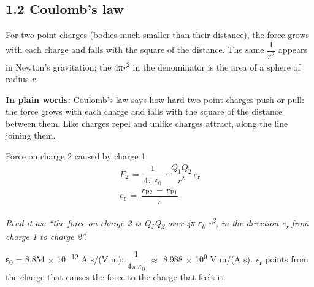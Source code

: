 \documentclass[11pt]{article}
\begin{document}
\begin{keepsection}
\section{1.2 Coulomb’s law}

For two point charges (bodies much smaller than their distance), the force grows with each charge and falls with the square of the distance. The same {\small\ensuremath{\dfrac{1}{{r}^{2}}}} appears in Newton’s gravitation; the 4π\textit{r}\textsuperscript{2} in the denominator is the area of a sphere of radius \textit{r}.

\begin{plainbox}\textbf{In plain words:} Coulomb’s law says how hard two point charges push or pull: the force grows with each charge and falls with the square of the distance between them. Like charges repel and unlike charges attract, along the line joining them.\end{plainbox}

\begin{equationcard}{Force on charge 2 caused by charge 1}
\[ \begin{gathered} {F}_{2}\, =\, \dfrac{1}{4π\, ε_{0}}\, \cdot \, \dfrac{{Q}_{1}{Q}_{2}}{{r}^{2}}\, {e}_{\mathrm{r}} \\ {e}_{\mathrm{r}}\, =\, \dfrac{{r}_{\mathrm{P}2}\, -\, {r}_{\mathrm{P}1}}{{r}} \end{gathered} \]
{\small \emph{Read it as: “the force on charge 2 is Q\textsubscript{1}Q\textsubscript{2} over 4π ε\textsubscript{0} r\textsuperscript{2}, in the direction e\textsubscript{r} from charge 1 to charge 2”.}\par ε\textsubscript{0} = 8.854 \ensuremath{\times} 10\textsuperscript{\ensuremath{-}12} A s/(V m); {\small\ensuremath{\dfrac{1}{4π\, ε_{0}}}} \ensuremath{\approx} 8.988 \ensuremath{\times} 10\textsuperscript{9} V m/(A s). \textit{e}\textsubscript{r} points from the charge that causes the force to the charge that feels it.}
\end{equationcard}


\end{keepsection}
\end{document}
